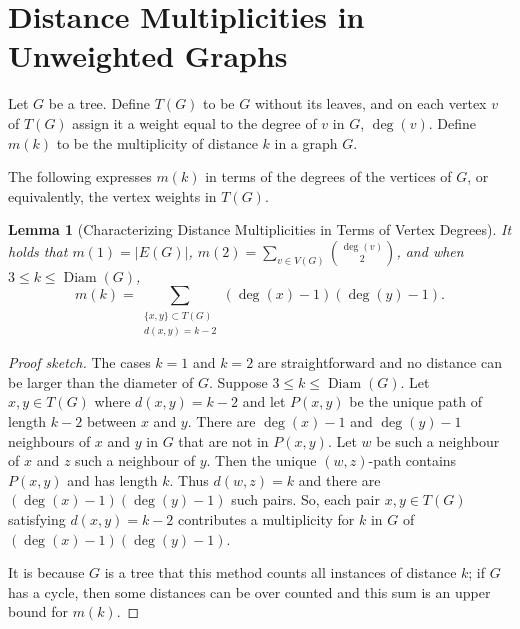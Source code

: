 \documentclass[12]{article}
\DeclareMathOperator{\diam}{Diam}
\newtheorem{lem}{Lemma} %
\newtheorem{cor}[thm]{Corollary}
\theoremstyle{definition}
\begin{document}
	
	\section{Distance Multiplicities in Unweighted Graphs}
	
	Let $G$ be a tree. Define $T(G)$ to be $G$ without its leaves, and on each vertex $v$ of $T(G)$ assign it a weight equal to the degree of $v$ in $G$, $\deg(v)$.  Define $m(k)$ to be the multiplicity of distance $k$ in a graph $G$.
	
	The following expresses $m(k)$ in terms of the degrees of the vertices of $G$, or equivalently, the vertex weights in $T(G)$.
	
	\begin{lem}[Characterizing Distance Multiplicities in Terms of Vertex Degrees]\label{Lemma-CharacterizingMultiplicityInTermsOfDegrees}
		It holds that $m(1) = |E(G)|$, $m(2) = \sum_{v \in V(G)} {\deg(v) \choose 2}$, and when $3 \leq k \leq \diam(G)$, 
		$$m(k) = \sum_{\substack{\{x,y\} \subset T(G) \\ d(x,y) = k-2}} (\deg(x)-1)(\deg(y)-1).$$
	\end{lem}

	\begin{proof}[Proof sketch]
		The cases $k = 1$ and $k=2$ are straightforward and no distance can be larger than the diameter of $G$.  Suppose $3 \leq k \leq \diam(G)$.  Let $x,y \in T(G)$ where $d(x,y) = k-2$ and let $P(x,y)$ be the unique path of length $k-2$ between $x$ and $y$.  There are $\deg(x)-1$ and $\deg(y)-1$ neighbours of $x$ and $y$ in $G$ that are not in $P(x,y)$.  Let $w$ be such a neighbour of $x$ and $z$ such a neighbour of $y$.  Then the unique $(w,z)$-path contains $P(x,y)$ and has length $k$.  Thus $d(w,z) = k$ and there are $(\deg(x)-1)(\deg(y)-1)$ such pairs.  So, each pair $x,y \in T(G)$ satisfying $d(x,y) = k-2$ contributes a multiplicity for $k$ in $G$ of $(\deg(x)-1)(\deg(y)-1)$.  
		
		It is because $G$ is a tree that this method counts all instances of distance $k$; if $G$ has a cycle, then some distances can be over counted and this sum is an upper bound for $m(k)$. \qedhere
	\end{proof}
	
\end{document}
